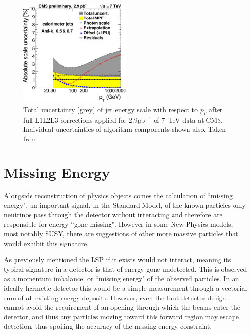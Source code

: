 \begin{figure}
\centering
\includegraphics[width=0.5\textwidth]{Figures/Objects/JESU}
\caption[Total uncertainty (grey) of jet energy scale with respect to $p_{T}$ after full L1L2L3 corrections applied for 2.9pb$^{-1}$ of 7~TeV data at CMS. ]{\label{fig:JESU}Total uncertainty (grey) of jet energy scale with respect to $p_{T}$ after full L1L2L3 corrections applied for 2.9pb$^{-1}$ of 7~TeV data at CMS. Individual uncertainties of algorithm components shown also. Taken from~\cite{JME-10-010}.}
\end{figure}

\section{Missing Energy}

Alongside reconstruction of physics objects comes the calculation of ``missing energy", an important signal. In the Standard Model, of the known particles only neutrinos pass through the detector without interacting and therefore are responsible for energy ``gone missing". However in some New Physics models, most notably SUSY, there are suggestions of other more massive particles that would exhibit this signature. 
 
As previously mentioned the LSP if it exists would not interact, meaning its typical signature in a detector is that of energy gone undetected. This is observed as a momentum imbalance, or ``missing energy" of the observed particles. In an ideally hermetic detector this would be a simple measurement through a vectorial sum of all existing energy deposits. However, even the best detector design cannot avoid the requirement of an opening through which the beams enter the detector, and thus any particles moving toward this forward region may escape detection, thus spoiling the accuracy of the missing energy constraint. 

